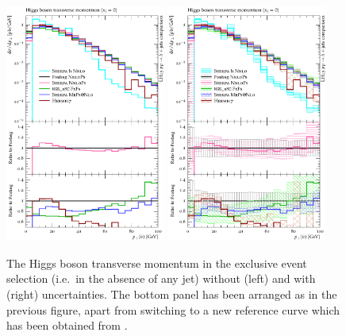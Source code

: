 \begin{figure}[t!]
  \centering
  \includegraphics[width=0.47\textwidth]{figures/hjetscomp_u_H_pT_excl.pdf}
  \hfill
  \includegraphics[width=0.47\textwidth]{figures/hjetscomp_H_pT_excl.pdf}
  \caption{\label{fig:higgscomp:results:exclobs:hpt}%
    The Higgs boson transverse momentum in the exclusive event
    selection (i.e.~in the absence of any jet) without (left) and with
    (right) uncertainties. The bottom panel has been arranged as in
    the previous figure, apart from switching to a new reference curve
    which has been obtained from \Powheg \NNLOPS.}
\end{figure}

